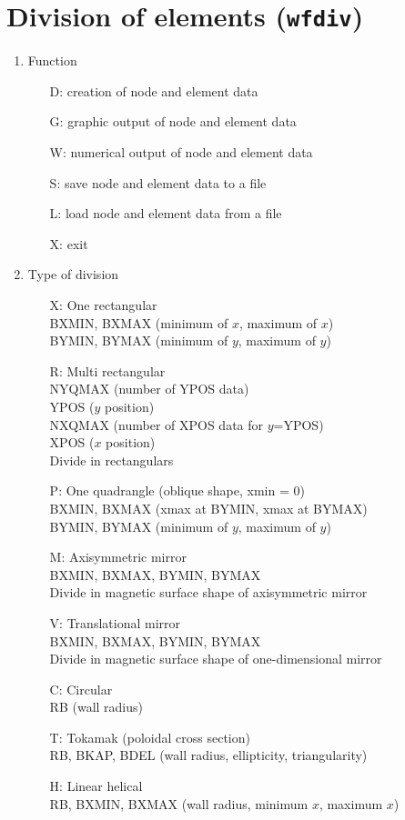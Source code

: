 \section{Division of elements ({\tt wfdiv})}
\begin{enumerate}
\item
Function
\begin{itemize}
\item[D:]
creation of node and element data
\item[G:]
graphic output of node and element data
\item[W:]
numerical output of node and element data
\item[S:]
save node and element data to a file
\item[L:]
load node and element data from a file
\item[X:]
exit
\end{itemize}

\item
Type of division
\begin{itemize}
\item[X:]
One rectangular
\\\qquad BXMIN, BXMAX (minimum of $x$, maximum of $x$)
\\\qquad BYMIN, BYMAX (minimum of $y$, maximum of $y$)
\item[R:]
Multi rectangular
\\\qquad NYQMAX (number of YPOS data)
\\\qquad\quad YPOS ($y$ position)
\\\qquad\quad NXQMAX (number of XPOS data for $y$=YPOS)
\\\qquad\quad\quad XPOS ($x$ position)
\\\quad Divide in rectangulars
\item[P:]
One quadrangle (oblique shape, xmin = 0)
\\\qquad BXMIN, BXMAX (xmax at BYMIN, xmax at BYMAX)
\\\qquad BYMIN, BYMAX (minimum of $y$, maximum of $y$)
\item[M:]
Axisymmetric mirror
\\\qquad BXMIN, BXMAX, BYMIN, BYMAX
\\\qquad Divide in magnetic surface shape of axisymmetric mirror
\item[V:]
Translational mirror
\\\qquad BXMIN, BXMAX, BYMIN, BYMAX
\\\qquad Divide in magnetic surface shape of one-dimensional mirror
\item[C:]
Circular
\\\qquad RB (wall radius)
\item[T:]
Tokamak (poloidal cross section)
\\\qquad RB, BKAP, BDEL (wall radius, ellipticity, triangularity)
\item[H:]
Linear helical
\\\qquad RB, BXMIN, BXMAX (wall radius, minimum $x$, maximum $x$)
\end{itemize}


\end{enumerate}
